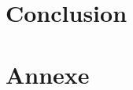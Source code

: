 \documentclass{article}
\begin{document}

\section{Conclusion}


\pagebreak


\section{Annexe}
\end{document}
